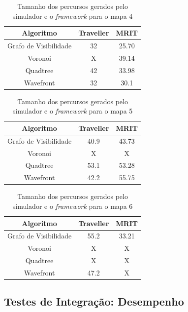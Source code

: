 \begin{table}[H]
	\centering
	\label{tab04}
	\begin{tabular}{ccc}
		\toprule
		\textbf{Algoritmo} & \textbf{Traveller} & \textbf{MRIT} \\
		\midrule
Grafo de Visibilidade & 32   & 25.70 \\
Voronoi 				  & X   & 39.14 \\
Quadtree				  & 42   & 33.98 \\
Wavefront             & 32    & 30.1  \\
		\bottomrule
	\end{tabular}
	\caption{Tamanho dos percursos gerados pelo simulador e o \textit{framework} para o mapa 4}
\end{table}

\begin{table}[H]
	\centering
	\label{tab05}
	\begin{tabular}{ccc}
		\toprule
		\textbf{Algoritmo} & \textbf{Traveller} & \textbf{MRIT} \\
		\midrule
Grafo de Visibilidade & 40.9   & 43.73 \\
Voronoi 				  & X      & X \\
Quadtree				  & 53.1   & 53.28 \\
Wavefront             & 42.2    & 55.75  \\
		\bottomrule
	\end{tabular}
	\caption{Tamanho dos percursos gerados pelo simulador e o \textit{framework} para o mapa 5}
\end{table}

\begin{table}[H]
	\centering
	\label{tab06}
	\begin{tabular}{ccc}
		\toprule
		\textbf{Algoritmo} & \textbf{Traveller} & \textbf{MRIT} \\
		\midrule
Grafo de Visibilidade & 55.2   & 33.21 \\
Voronoi 				  & X      & X \\
Quadtree				  & X      & X \\
Wavefront             & 47.2    & X  \\
		\bottomrule
	\end{tabular}
	\caption{Tamanho dos percursos gerados pelo simulador e o \textit{framework} para o mapa 6}
\end{table}

\subsection{Testes de Integração: Desempenho}

